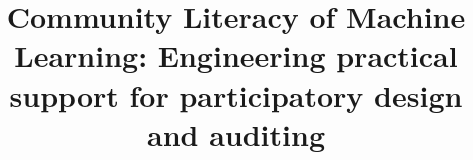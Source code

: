 \def\plaintitle{Community Literacy of Machine Learning: Engineering practical support for participatory design and auditing}
\def\plainkeywords{Algorithm; Fairness; Transparency; Wikipedia; Collaboration; Participatory design; Auditing}
\def\plaingeneralterms{Algorithm, Fairness, Transparency, Wikipedia, Collaboration, Participatory, Auditing}
\title{Community Literacy of Machine Learning: Engineering practical support for participatory design and auditing}
